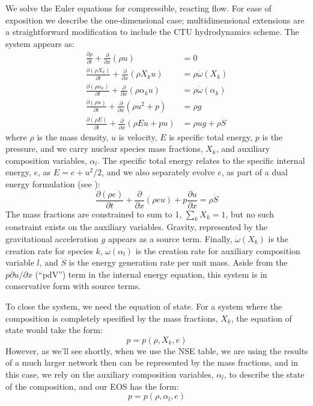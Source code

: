 \documentclass[times,modern]{aastex63}
\newcommand{\omegadot}{\dot{\omega}}
\newcommand{\Sdot}{\dot{S}}
\newcommand{\ddx}[1]{{\frac{{\partial#1}}{\partial x}}}
\newcommand{\ddxs}[1]{{\frac{{\partial}}{\partial x}}#1}
\newcommand{\ddt}[1]{{\frac{{\partial#1}}{\partial t}}}
\begin{document}
We solve the Euler equations for compressible, reacting flow.  For ease
of exposition we describe the one-dimensional case;
multidimensional extensions are a straightforward modification to
include the CTU hydrodynamics scheme.
The system appears as:
\begin{align}
\label{eq:conserved_system}
\ddt{\rho} + \ddxs{(\rho u)} &= 0 \\
\ddt{(\rho X_k)} + \ddxs{(\rho X_k u)} &= \rho \omegadot(X_k) \\
\ddt{(\rho \alpha_k)} + \ddxs{(\rho \alpha_k u)} &= \rho \omegadot(\alpha_k) \\
\ddt{(\rho u)} + \ddxs{(\rho u^2 + p)} &= \rho g \\
\ddt{(\rho E)} + \ddxs{(\rho E u + p u)} &= \rho ug + \rho \Sdot 
\end{align}
where $\rho$ is the mass density, $u$ is velocity, $E$ is specific
total energy, $p$ is the pressure, and we carry nuclear species mass
fractions, $X_k$, and auxiliary composition variables, $\alpha_l$.  The specific total
energy relates to the specific internal energy, $e$, as $E = e + u^2/2$,
and we also separately evolve $e$, as part of a dual
energy formulation (see \citealt{bryan:1995,wdmergerI}):
\begin{equation}
\ddt{(\rho e)} + \ddxs{(\rho e u)} + p \ddx{u} = \rho \Sdot
\end{equation}
 The mass fractions are constrained to sum to 1, $\sum_k X_k = 1$, but
 no such constraint exists on the auxiliary variables.  Gravity,
 represented by the gravitational acceleration $g$ appears as a source
 term.  Finally, $\omegadot(X_k)$ is the creation rate for species
 $k$, $\omegadot(\alpha_l)$ is the creation rate for auxiliary
 composition variable $l$, and $\dot{S}$ is the energy generation rate
 per unit mass.  Aside from the $p\partial u/\partial x$ (``pdV'')
 term in the internal energy equation, this system is in conservative
 form with source terms.

To close the system, we need the equation of state.  For a system
where the composition is completely specified by the mass fractions,
$X_k$, the equation of state would take the form:
\begin{equation}
p = p(\rho, X_k, e)
\end{equation}
However, as we'll see shortly, when we use the NSE table, we are using
the results of a much larger network then can be represented by the
mass fractions, and in this case, we rely on the auxiliary composition
variables, $\alpha_l$, to describe the state of the composition, and
our EOS has the form:
\begin{equation}
p = p(\rho, \alpha_l, e)
\end{equation}
\end{document}
